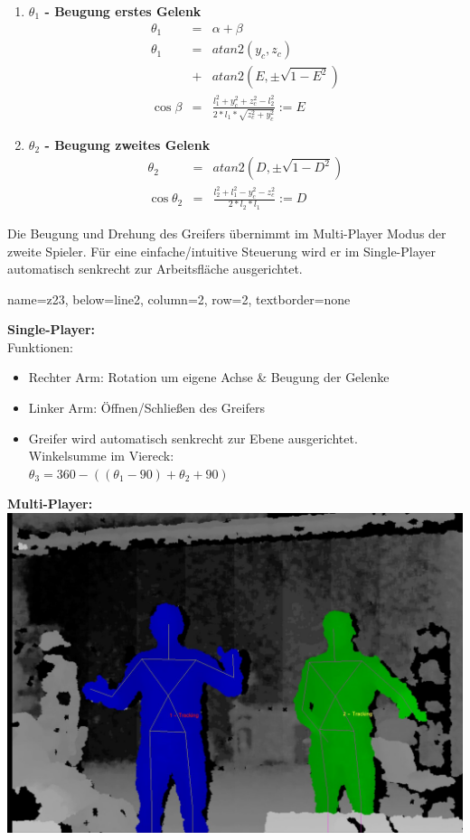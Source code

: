 \documentclass[portrait,a0paper]{baposter}
\begin{document}
\begin{poster}
{\begin{enumerate}
	\item \textbf{$\theta_1$ - Beugung erstes Gelenk}
\begin{eqnarray*}
\theta_1 &=& \alpha + \beta \\
\theta_1 &=& atan2(y_c, z_c)\\ &+& atan2(E, \pm \sqrt{1-E^2}) \\
\cos \beta &=& \frac{l_1^2 + y_c^2 + z_c^2 - l_2^2}{2*l_1*\sqrt{z_c^2 + y_c^2}} := E 
	\end{eqnarray*}

	\item \textbf{$\theta_2$ - Beugung zweites Gelenk}
\begin{eqnarray*}
\theta_2 &=& atan2(D, \pm \sqrt{1-D^2}) \\
\cos \theta_2 &=& \frac{l_2^2 + l_1^2 - y_c^2 - z_c^2}{2*l_2*l_1} :=D
\end{eqnarray*}	
\end{enumerate}
	
Die Beugung und Drehung des Greifers übernimmt im Multi-Player Modus der zweite Spieler. Für eine einfache/intuitive Steuerung wird er im Single-Player automatisch senkrecht zur Arbeitsfläche ausgerichtet.
	  



 }
    {
    name=z23,
    below=line2,
    column=2,
    row=2,
    textborder=none
    }
    {
 \textbf{Single-Player:}\\
 Funktionen:
\begin{itemize}
\item Rechter Arm: Rotation um eigene Achse \& Beugung der Gelenke
\item Linker Arm: Öffnen/Schließen des Greifers
\item Greifer wird automatisch senkrecht zur Ebene ausgerichtet. \\
Winkelsumme im Viereck: \\ $\theta_3 = 360-((\theta_1-90)+\theta_2+90)$
\end{itemize}


 \textbf{Multi-Player:}\\
\includegraphics[width=\textwidth]{imgs/multiplayer.jpg}

}
\end{poster}
\end{document}
